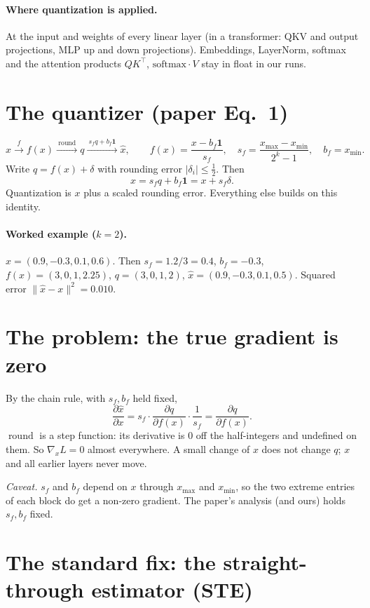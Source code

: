 \documentclass[11pt]{article}
\newcommand{\one}{\mathbf 1}
\newcommand{\rnd}{\operatorname{round}}
\begin{document}
\paragraph{Where quantization is applied.} At the input and weights of every linear layer (in a transformer: QKV and output projections, MLP up and down projections). Embeddings, LayerNorm, softmax and the attention products $QK^\top$, $\mathrm{softmax}\cdot V$ stay in float in our runs.

\section{The quantizer (paper Eq.~1)}

\[
x\xrightarrow{\ f\ }f(x)\xrightarrow{\ \rnd\ }q\xrightarrow{\ s_fq+b_f\one\ }\hat x,
\qquad
f(x)=\frac{x-b_f\one}{s_f},\quad s_f=\frac{x_{\max}-x_{\min}}{2^k-1},\quad b_f=x_{\min}.
\]
Write $q=f(x)+\delta$ with rounding error $|\delta_i|\le\tfrac12$. Then
\[
\boxed{\hat x=s_fq+b_f\one=x+s_f\delta.}
\]
Quantization is $x$ plus a scaled rounding error. Everything else builds on this identity.

\paragraph{Worked example ($k=2$).} $x=(0.9,-0.3,0.1,0.6)$. Then $s_f=1.2/3=0.4$, $b_f=-0.3$, $f(x)=(3,0,1,2.25)$, $q=(3,0,1,2)$, $\hat x=(0.9,-0.3,0.1,0.5)$. Squared error $\|\hat x-x\|^2=0.010$.

\section{The problem: the true gradient is zero}

By the chain rule, with $s_f,b_f$ held fixed,
\[
\frac{\partial\hat x}{\partial x}=s_f\cdot\frac{\partial q}{\partial f(x)}\cdot\frac1{s_f}=\frac{\partial q}{\partial f(x)}.
\]
$\rnd$ is a step function: its derivative is $0$ off the half-integers and undefined on them. So $\nabla_xL=0$ almost everywhere. A small change of $x$ does not change $q$; $x$ and all earlier layers never move.

\textit{Caveat.} $s_f$ and $b_f$ depend on $x$ through $x_{\max}$ and $x_{\min}$, so the two extreme entries of each block do get a non-zero gradient. The paper's analysis (and ours) holds $s_f,b_f$ fixed.

\section{The standard fix: the straight-through estimator (STE)}
\end{document}
